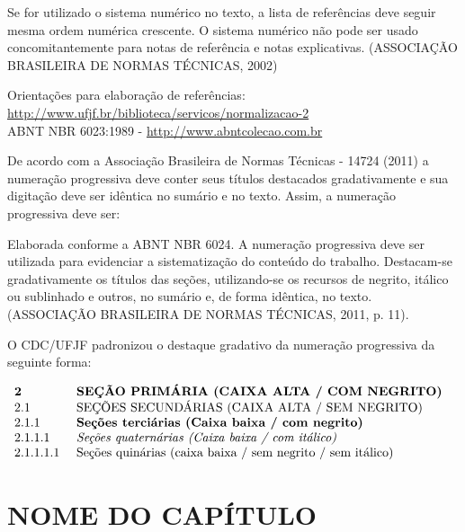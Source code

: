 \documentclass[
        12pt,
        openany, %
        oneside, %
        a4paper,
        english,
        brazil			        %
        ]{abntbibufjf}
\begin{document}
Se for utilizado o sistema num\'erico no texto, a lista de refer\^encias deve
seguir mesma ordem num\'erica crescente. O sistema num\'erico n\~ao pode ser usado
concomitantemente para notas de refer\^encia e notas explicativas. (ASSOCIA\c{C}\~AO BRASILEIRA DE NORMAS T\'ECNICAS, 2002)

Orienta\c{c}\~oes para elabora\c{c}\~ao de refer\^encias: \\
\url{http://www.ufjf.br/biblioteca/servicos/normalizacao-2} \\
ABNT NBR 6023:1989 - \url{http://www.abntcolecao.com.br}


De acordo com a Associa\c{c}\~ao Brasileira de Normas T\'ecnicas - 14724 (2011) a numera\c{c}\~ao
progressiva deve conter seus t\'itulos destacados gradativamente e sua digita\c{c}\~ao deve
ser id\^entica no sum\'ario e no texto. Assim, a numera\c{c}\~ao progressiva deve ser:
\begin{citacao}
Elaborada conforme a ABNT NBR 6024. A numera\c{c}\~ao progressiva deve ser utilizada para
evidenciar a sistematiza\c{c}\~ao do conte\'udo do trabalho. Destacam-se gradativamente os
t\'itulos das se\c{c}\~oes, utilizando-se os recursos de negrito, it\'alico ou sublinhado e
outros, no sum\'ario e, de forma id\^entica, no texto. (ASSOCIA\c{C}\~AO BRASILEIRA DE NORMAS
T\'ECNICAS, 2011, p. 11).
\end{citacao}

O CDC/UFJF padronizou o destaque gradativo da numera\c{c}\~ao progressiva da seguinte forma:

$
\begin{array}{ll}
\textbf{2} & \mbox{ \textbf{SE\c{C}\~AO PRIM\'ARIA (CAIXA ALTA / COM NEGRITO)}}\\
2.1 & \mbox{ SE\c{C}\~OES SECUND\'ARIAS (CAIXA ALTA / SEM NEGRITO)}\\
2.1.1 & \mbox{ \textbf{Se\c{c}\~oes terci\'arias (Caixa baixa / com negrito)}} \\
2.1.1.1 & \mbox{ \textit{Se\c{c}\~oes quatern\'arias (Caixa baixa / com it\'alico)}} \\
2.1.1.1.1 & \mbox{ Se\c{c}\~oes quin\'arias (caixa baixa / sem negrito / sem it\'alico)}
\end{array}
$


\chapter{NOME DO CAP\'ITULO}
\end{document}
